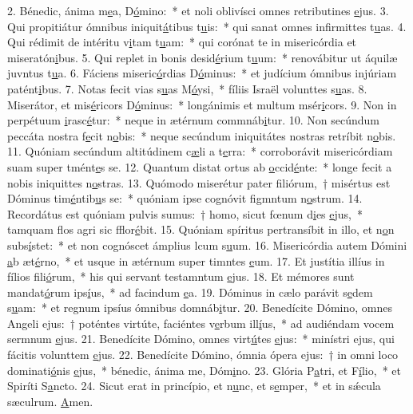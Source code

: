 2. Bénedic, ánima m\uline{e}a, D\uline{ó}mino:~* et noli oblivísci omnes retributines \uline{e}jus.
3. Qui propitiátur ómnibus iniquit\uline{á}tibus t\uline{u}is:~* qui sanat omnes infirmittes t\uline{u}as.
4. Qui rédimit de intéritu v\uline{i}tam t\uline{u}am:~* qui corónat te in misericórdia et miseratón\uline{i}bus.
5. Qui replet in bonis desid\uline{é}rium t\uline{u}um:~* renovábitur ut áquilæ juvntus t\uline{u}a.
6. Fáciens miseric\uline{ó}rdias D\uline{ó}minus:~* et judícium ómnibus injúriam patént\uline{i}bus.
7. Notas fecit vias s\uline{u}as M\uline{ó}ysi,~* fíliis Israël volunttes s\uline{u}as.
8. Miserátor, et mis\uline{é}ricors D\uline{ó}minus:~* longánimis et multum msér\uline{i}cors.
9. Non in perpétuum \uline{i}rasc\uline{é}tur:~* neque in ætérnum commnáb\uline{i}tur.
10. Non secúndum peccáta nostra f\uline{e}cit n\uline{o}bis:~* neque secúndum iniquitátes nostras retríbit n\uline{o}bis.
11. Quóniam secúndum altitúdinem c\uline{æ}li a t\uline{e}rra:~* corroborávit misericórdiam suam super tmént\uline{e}s se.
12. Quantum distat ortus ab \uline{o}ccid\uline{é}nte:~* longe fecit a nobis iniquittes n\uline{o}stras.
13. Quómodo miserétur pater filiórum,~† misértus est Dóminus tim\uline{é}ntib\uline{u}s se:~* quóniam ipse cognóvit figmntum n\uline{o}strum.
14. Recordátus est quóniam pulvis sumus:~† homo, sicut fœnum d\uline{i}es \uline{e}jus,~* tamquam flos agri sic fflor\uline{é}bit.
15. Quóniam spíritus pertransíbit in illo, et n\uline{o}n subs\uline{í}stet:~* et non cognóscet ámplius lcum s\uline{u}um.
16. Misericórdia autem Dómini \uline{a}b æt\uline{é}rno,~* et usque in ætérnum super timntes \uline{e}um.
17. Et justítia illíus in fílios f\uline{i}li\uline{ó}rum,~* his qui servant testamntum \uline{e}jus.
18. Et mémores sunt mandat\uline{ó}rum ips\uline{í}us,~* ad facindum \uline{e}a.
19. Dóminus in cælo parávit s\uline{e}dem s\uline{u}am:~* et regnum ipsíus ómnibus domnáb\uline{i}tur.
20. Benedícite Dómino, omnes Angeli ejus:~† poténtes virtúte, faciéntes v\uline{e}rbum ill\uline{í}us,~* ad audiéndam vocem sermnum \uline{e}jus.
21. Benedícite Dómino, omnes virt\uline{ú}tes \uline{e}jus:~* minístri ejus, qui fácitis volunttem \uline{e}jus.
22. Benedícite Dómino, ómnia ópera ejus:~† in omni loco dominati\uline{ó}nis \uline{e}jus,~* bénedic, ánima me, Dóm\uline{i}no.
23. Glória P\uline{a}tri, et F\uline{í}lio,~* et Spiríti S\uline{a}ncto.
24. Sicut erat in princípio, et n\uline{u}nc, et s\uline{e}mper,~* et in sǽcula sæculrum. \uline{A}men.
